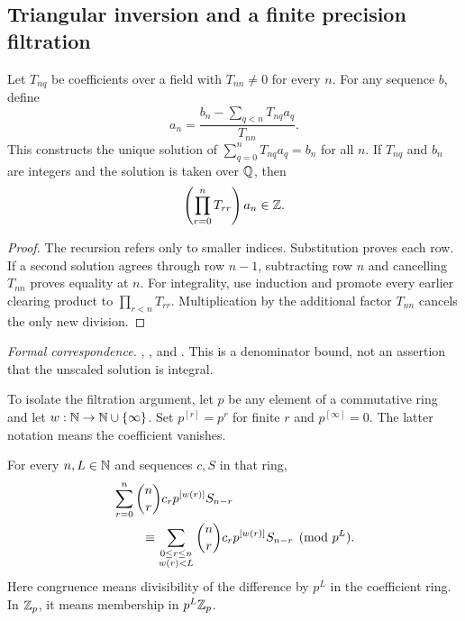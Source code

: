 \subsection{Triangular inversion and a finite precision filtration}

\begin{theorem}
\label{thm:triangular-foundation}
Let $T_{nq}$ be coefficients over a field with $T_{nn}\ne0$ for every $n$.
For any sequence $b$, define
\[
a_n=\frac{b_n-\sum_{q<n}T_{nq}a_q}{T_{nn}}.
\]
This constructs the unique solution of
$\sum_{q=0}^{n}T_{nq}a_q=b_n$ for all $n$. If $T_{nq}$ and $b_n$ are integers
and the solution is taken over $\mathbb Q$, then
\[
\left(\prod_{r=0}^{n}T_{rr}\right)a_n\in\mathbb Z.
\]
\end{theorem}

\begin{proof}
The recursion refers only to smaller indices. Substitution proves each row.
If a second solution agrees through row $n-1$, subtracting row $n$ and
cancelling $T_{nn}$ proves equality at $n$. For integrality, use induction and
promote every earlier clearing product to $\prod_{r<n}T_{rr}$. Multiplication
by the additional factor $T_{nn}$ cancels the only new division.
\end{proof}

\begingroup\small\raggedright
\noindent\emph{Formal correspondence.}
, , and
. This is a denominator bound,
not an assertion that the unscaled solution is integral.
\par\endgroup

To isolate the filtration argument, let $p$ be any element of a commutative
ring and let $w:\mathbb N\to\mathbb N\cup\{\infty\}$. Set $p^{[r]}=p^r$ for finite $r$
and $p^{[\infty]}=0$. The latter notation means the coefficient vanishes.

\begin{theorem}
\label{thm:filtered-foundation}
For every $n,L\in\mathbb N$ and sequences $c,S$ in that ring,
\[
\begin{split}
&\sum_{r=0}^{n}\binom nr c_rp^{[w(r)]}S_{n-r}\\
&\hspace{8mm}\equiv
\sum_{\substack{0\leq r\leq n\\w(r)<L}}
\binom nr c_rp^{[w(r)]}S_{n-r}\pmod{p^L}.
\end{split}
\]
Here congruence means divisibility of the difference by $p^L$ in the
coefficient ring. In $\mathbb Z_p$, it means membership in $p^L\mathbb Z_p$.
\end{theorem}

